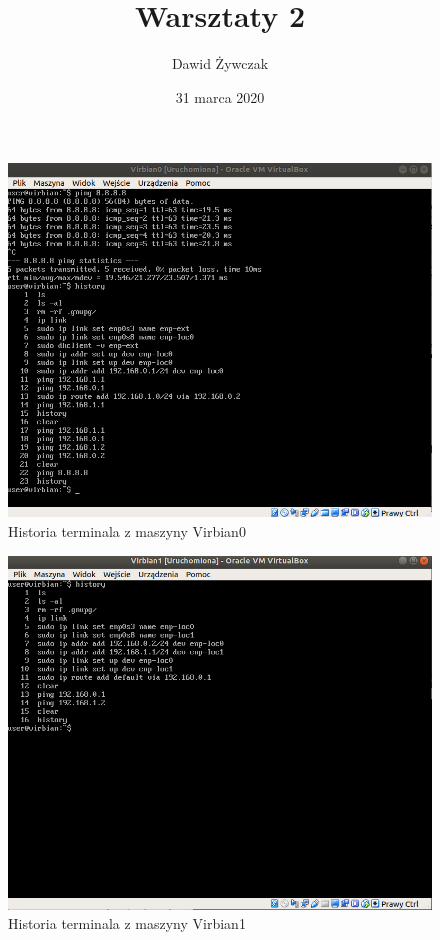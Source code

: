 \documentclass[a4paper]{scrartcl}
\title{Warsztaty 2}
\author{Dawid Żywczak}
\date{31 marca 2020}
\begin{document}
\maketitle

\begin{figure}
  \includegraphics[width=\linewidth]{hv1.png}
  \caption{Historia terminala z maszyny Virbian0}
  \label{fig:hv1}
\end{figure}

\begin{figure}
  \includegraphics[width=\linewidth]{hw2.png}
  \caption{Historia terminala z maszyny Virbian1}
  \label{fig:hv2}
\end{figure}
\end{document}
